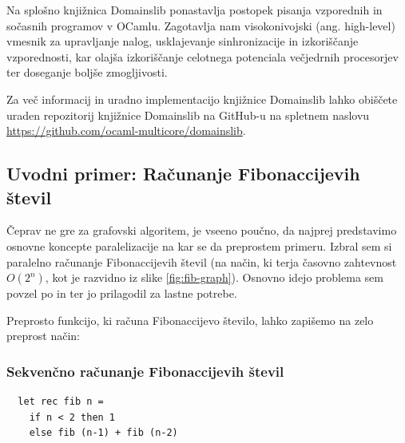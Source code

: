 \documentclass[mat1, tisk]{fmfdelo}
\begin{document}
Na splošno knjižnica Domainslib ponastavlja postopek pisanja vzporednih in sočasnih programov v OCamlu. 
Zagotavlja nam visokonivojski (ang. high-level) vmesnik za upravljanje nalog, usklajevanje sinhronizacije in
izkoriščanje vzporednosti, kar olajša izkoriščanje celotnega potenciala večjedrnih procesorjev ter doseganje boljše
zmogljivosti.

Za več informacij in uradno implementacijo knjižnice Domainslib lahko obiščete uraden repozitorij
knjižnice Domainslib na GitHub-u na spletnem naslovu \url{https://github.com/ocaml-multicore/domainslib}.


\subsection{Uvodni primer: Računanje Fibonaccijevih števil}

Čeprav ne gre za grafovski algoritem, je vseeno poučno, da najprej predstavimo osnovne koncepte
paralelizacije na kar se da preprostem primeru. Izbral sem si paralelno računanje Fibonaccijevih števil
(na način, ki terja časovno zahtevnost $O(2^n)$, kot je razvidno iz slike \ref{fig:fib-graph}).
Osnovno idejo problema sem povzel po \cite{parallel_fib_computation} in \cite{multicore_ocaml_article} ter jo prilagodil
za lastne potrebe.

Preprosto funkcijo, ki računa Fibonaccijevo število, lahko zapišemo na zelo preprost način:

\subsubsection{Sekvenčno računanje Fibonaccijevih števil}

\begin{lstlisting}
  let rec fib n =
    if n < 2 then 1
    else fib (n-1) + fib (n-2)
\end{lstlisting}
\end{document}
